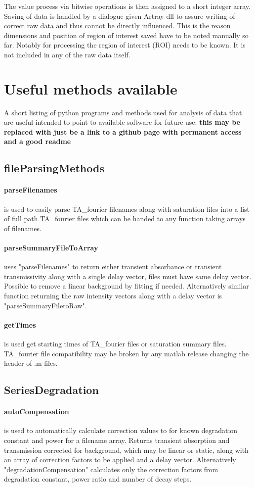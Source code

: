 \documentclass[twoside,openright]{scrreprt}
\begin{document}
{The value process via bitwise operations is then assigned to a short integer array. Saving of data is handled by a dialogue given Artray dll to assure writing of correct raw data and thus cannot be directly influenced. This is the reason dimensions and position of region of interest saved have to be noted manually so far. Notably for processing the region of interest (ROI) needs to be known. It is not included in any of the raw data itself.

\section{Useful methods available}
A short listing of python programs and methods used for analysis of data that are useful intended to point to available software for future use: \textbf{this may be replaced with just be a link to a github page with permanent access and a good readme}
\subsection*{fileParsingMethods}
\paragraph{parseFilenames} is used to easily parse TA\_fourier filenames along with saturation files into a list of full path TA\_fourier files which can be handed to any function taking arrays of filenames.
\paragraph{parseSummaryFileToArray} uses "parseFilenames" to return either transient absorbance or transient transmissivity along with a single delay vector, files must have same delay vector. Possible to remove a linear background by fitting if needed. Alternatively similar function returning the raw intensity vectors along with a delay vector is "parseSummaryFiletoRaw".
\paragraph{getTimes} is used get starting times of TA\_fourier files or saturation summary files. TA\_fourier file compatibility may be broken by any matlab release changing the header of .m files.
\subsection*{SeriesDegradation}
\paragraph{autoCompensation} is used to automatically calculate correction values to for known degradation constant and power for a filename array. Returns transient absorption and transmission corrected for background, which may be linear or static, along with an array of correction factors to be applied and a delay vector. Alternatively "degradationCompensation" calculates only the correction factors from degradation constant, power ratio and number of decay steps.
}
\end{document}
